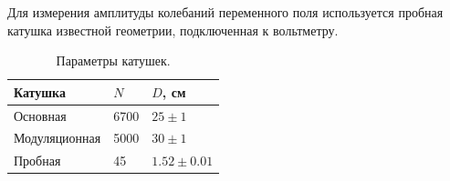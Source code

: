 \documentclass[a4paper,12pt]{article} %
\begin{document}
    Для измерения амплитуды колебаний переменного поля используется пробная катушка известной геометрии, подключенная к вольтметру.\par
    \begin{table}[h!]
      \centering
      \begin{tabular}{|l|l|l|}
      \hline
      \textbf{Катушка} & $N$ & $D$, см \\ \hline \hline
      Основная         & 6700         & $25\pm1$             \\ \hline
      Модуляционная    & 5000         & $30\pm1$             \\ \hline
      Пробная          & 45           & $1.52\pm0.01$             \\ \hline
      \end{tabular}
      \caption{Параметры катушек.}
    \end{table}
\end{document}
